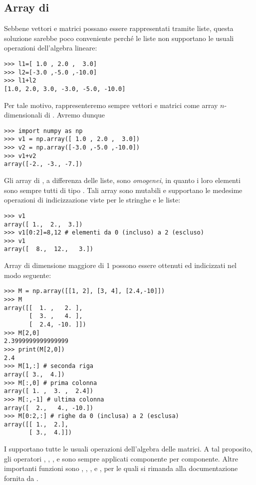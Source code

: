 \subsection{Array di \numpy}
\label{sez:array-di-numpy}

Sebbene vettori e matrici possano essere rappresentati tramite liste,
questa soluzione sarebbe poco conveniente perch\'e le liste non
supportano le usuali operazioni dell'algebra lineare:
\begin{verbatim}
>>> l1=[ 1.0 , 2.0 ,  3.0]
>>> l2=[-3.0 ,-5.0 ,-10.0]
>>> l1+l2
[1.0, 2.0, 3.0, -3.0, -5.0, -10.0]
\end{verbatim}
Per tale motivo, rappresenteremo sempre vettori e matrici come array
$n$-dimensionali di \numpy. Avremo dunque
\begin{verbatim}
>>> import numpy as np
>>> v1 = np.array([ 1.0 , 2.0 ,  3.0])
>>> v2 = np.array([-3.0 ,-5.0 ,-10.0])
>>> v1+v2
array([-2., -3., -7.])
\end{verbatim}

Gli array di \numpy, a differenza delle liste, sono \emph{omogenei},
in quanto i loro elementi sono sempre tutti di tipo
. Tali array sono mutabili e supportano le medesime
operazioni di indicizzazione viste per le stringhe e le liste:
\begin{verbatim}
>>> v1
array([ 1.,  2.,  3.])
>>> v1[0:2]=8,12 # elementi da 0 (incluso) a 2 (escluso)
>>> v1
array([  8.,  12.,   3.])
\end{verbatim}

Array di dimensione maggiore di 1 possono essere ottenuti ed
indicizzati nel modo seguente:
\begin{verbatim}
>>> M = np.array([[1, 2], [3, 4], [2.4,-10]])
>>> M
array([[  1. ,   2. ],
       [  3. ,   4. ],
       [  2.4, -10. ]])
>>> M[2,0]
2.3999999999999999
>>> print(M[2,0])
2.4
>>> M[1,:] # seconda riga
array([ 3.,  4.])
>>> M[:,0] # prima colonna
array([ 1. ,  3. ,  2.4])
>>> M[:,-1] # ultima colonna
array([  2.,   4., -10.])
>>> M[0:2,:] # righe da 0 (inclusa) a 2 (esclusa)
array([[ 1.,  2.],
       [ 3.,  4.]])
\end{verbatim}

I  supportano tutte le usuali operazioni
dell'algebra delle matrici. A tal proposito, gli operatori
\istr{+}, \istr{-}, \istr{*}, \istr{/} e \istr{**} sono sempre
applicati componente per componente. Altre importanti funzioni sono
, , ,
 e , per le quali si rimanda alla
documentazione fornita da .

